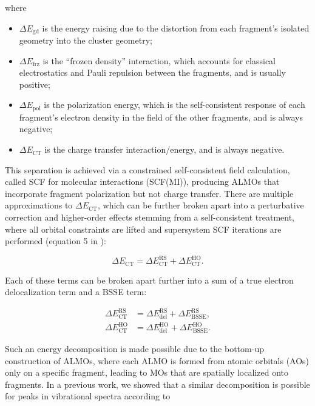 where

\begin{itemize}
\item \(\Delta E_{\text{gd}}\) is the energy raising due to the distortion from each fragment's isolated geometry into the cluster geometry;
\item \(\Delta E_{\text{frz}}\) is the ``frozen density'' interaction, which accounts for classical electrostatics and Pauli repulsion between the fragments, and is usually positive;
\item \(\Delta E_{\text{pol}}\) is the polarization energy, which is the self-consistent response of each fragment's electron density in the field of the other fragments, and is always negative;
\item \(\Delta E_{\text{CT}}\) is the charge transfer interaction/energy, and is always negative.
\end{itemize}

This separation is achieved via a constrained self-consistent field calculation, called SCF for molecular interactions (SCF(MI)), producing ALMOs that incorporate fragment polarization but not charge transfer. There are multiple approximations to \(\Delta E_{\text{CT}}\), which can be further broken apart into a perturbative correction and higher-order effects stemming from a self-consistent treatment, where all orbital constraints are lifted and supersystem SCF iterations are performed (equation 5 in ):

\begin{equation}
  \label{eq:almo-eda-ct}
  \Delta E_{\text{CT}} = \Delta E_{\text{CT}}^{\text{RS}} + \Delta E_{\text{CT}}^{\text{HO}}.
\end{equation}

Each of these terms can be broken apart further into a sum of a true electron delocalization term and a BSSE term:

\begin{equation}
  \begin{aligned}
    \label{eq:almo-eda-ct-bsse}
    \Delta E_{\text{CT}}^{\text{RS}} &= \Delta E_{\text{del}}^{\text{RS}} + \Delta E_{\text{BSSE}}^{\text{RS}}, \\
    \Delta E_{\text{CT}}^{\text{HO}} &= \Delta E_{\text{del}}^{\text{HO}} + \Delta E_{\text{BSSE}}^{\text{HO}}.
  \end{aligned}
\end{equation}

Such an energy decomposition is made possible due to the bottom-up construction of ALMOs, where each ALMO is formed from atomic orbitals (AOs) only on a specific fragment, leading to MOs that are spatially localized onto fragments. In a previous work\cite{Brinzer_2015_212425}, we showed that a similar decomposition is possible for peaks in vibrational spectra according to

